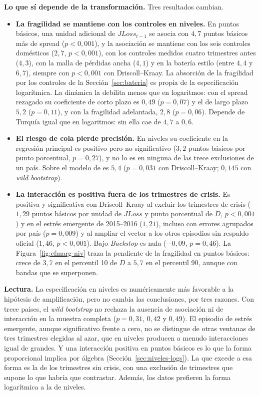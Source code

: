 \textbf{Lo que sí depende de la transformación.} Tres resultados cambian.
\begin{itemize}
    \item \textbf{La fragilidad se mantiene con los controles en niveles.} En puntos básicos, una unidad adicional de $JLoss_{t-1}$ se asocia con $4{,}7$ puntos básicos más de spread ($p<0{,}001$), y la asociación se mantiene con los seis controles domésticos ($2{,}7$, $p<0{,}001$), con los controles medidos cuatro trimestres antes ($4{,}3$), con la malla de pérdidas ancha ($4{,}1$) y en la batería estilo \citet{Chari2024b} (entre $4{,}4$ y $6{,}7$), siempre con $p<0{,}001$ con Driscoll--Kraay. La absorción de la fragilidad por los controles de la Sección~\ref{sec:bateria} es propia de la especificación logarítmica. La dinámica la debilita menos que en logaritmos: con el spread rezagado su coeficiente de corto plazo es $0{,}49$ ($p=0{,}07$) y el de largo plazo $5{,}2$ ($p=0{,}11$), y con la fragilidad adelantada, $2{,}8$ ($p=0{,}06$). Depende de Turquía igual que en logaritmos: sin ella cae de $4{,}7$ a $0{,}6$.
    \item \textbf{El riesgo de cola pierde precisión.} En niveles su coeficiente en la regresión principal es positivo pero no significativo ($3{,}2$ puntos básicos por punto porcentual, $p=0{,}27$), y no lo es en ninguna de las trece exclusiones de un país. Sobre el modelo de \citet{Chari2024b} es $5{,}4$ ($p=0{,}031$ con Driscoll--Kraay; $0{,}145$ con \textit{wild bootstrap}).
    \item \textbf{La interacción es positiva fuera de los trimestres de crisis.} Es positiva y significativa con Driscoll--Kraay al excluir los trimestres de crisis ($1{,}29$ puntos básicos por unidad de $JLoss$ y punto porcentual de $D$, $p<0{,}001$) y en el estrés emergente de 2015--2016 ($1{,}21$), incluso con errores agrupados por país ($p=0{,}009$) y al ampliar el vector a los otros episodios sin respaldo oficial ($1{,}46$, $p<0{,}001$). Bajo \textit{Backstop} es nula ($-0{,}09$, $p=0{,}46$). La Figura~\ref{fig:efmarg-niv} traza la pendiente de la fragilidad en puntos básicos: crece de $3{,}7$ en el percentil 10 de $D$ a $5{,}7$ en el percentil 90, aunque con bandas que se superponen.
\end{itemize}

\textbf{Lectura.} La especificación en niveles es numéricamente más favorable a la hipótesis de amplificación, pero no cambia las conclusiones, por tres razones. Con trece países, el \textit{wild bootstrap} no rechaza la ausencia de asociación ni de interacción en la muestra completa ($p=0{,}31$, $0{,}42$ y $0{,}49$). El episodio de estrés emergente, aunque significativo frente a cero, no se distingue de otras ventanas de tres trimestres elegidas al azar, que en niveles producen a menudo interacciones igual de grandes. Y una interacción positiva en puntos básicos es lo que la forma proporcional implica por álgebra (Sección~\ref{sec:niveles-logs}). La que excede a esa forma es la de los trimestres sin crisis, con una exclusión de trimestres que supone lo que habría que contrastar. Además, los datos prefieren la forma logarítmica a la de niveles.

